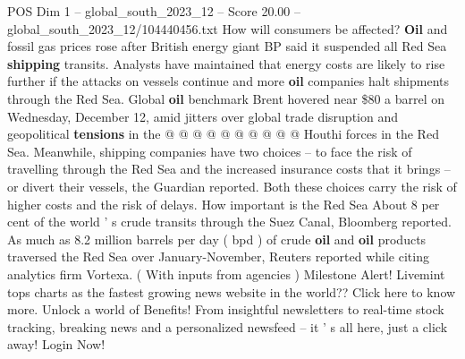 \begin{textsample}{POS Dim 1 – global\_south\_2023\_12 – Score 20.00 – global\_south\_2023\_12/104440456.txt}
How will consumers be affected? \textbf{Oil} and fossil gas prices rose after British energy giant BP said it suspended all Red Sea \textbf{shipping} transits.
Analysts have maintained that energy costs are likely to rise further if the attacks on vessels continue and more \textbf{oil} companies halt shipments through the Red Sea.
Global \textbf{oil} benchmark Brent hovered near \$80 a barrel on Wednesday, December 12, amid jitters over global trade disruption and geopolitical \textbf{tensions} in the @ @ @ @ @ @ @ @ @ @ Houthi forces in the Red Sea.
Meanwhile, shipping companies have two choices -- to face the risk of travelling through the Red Sea and the increased insurance costs that it brings -- or divert their vessels, the Guardian reported.
Both these choices carry the risk of higher costs and the risk of delays.
How important is the Red Sea About 8 per cent of the world ' s crude transits through the Suez Canal, Bloomberg reported.
As much as 8.2 million barrels per day ( bpd ) of crude \textbf{oil} and \textbf{oil} products traversed the Red Sea over January-November, Reuters reported while citing analytics firm Vortexa. ( With inputs from agencies ) Milestone Alert!
Livemint tops charts as the fastest growing news website in the world??
Click here to know more.
Unlock a world of Benefits!
From insightful newsletters to real-time stock tracking, breaking news and a personalized newsfeed -- it ' s all here, just a click away!
Login Now!

\end{textsample}
